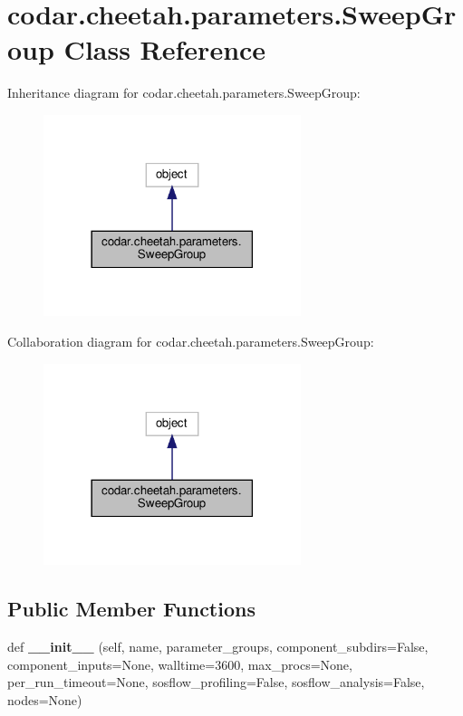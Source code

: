 \hypertarget{classcodar_1_1cheetah_1_1parameters_1_1_sweep_group}{}\section{codar.\+cheetah.\+parameters.\+Sweep\+Group Class Reference}
\label{classcodar_1_1cheetah_1_1parameters_1_1_sweep_group}


Inheritance diagram for codar.\+cheetah.\+parameters.\+Sweep\+Group\+:
\nopagebreak
\begin{figure}[H]
\begin{center}
\leavevmode
\includegraphics[width=213pt]{classcodar_1_1cheetah_1_1parameters_1_1_sweep_group__inherit__graph}
\end{center}
\end{figure}


Collaboration diagram for codar.\+cheetah.\+parameters.\+Sweep\+Group\+:
\nopagebreak
\begin{figure}[H]
\begin{center}
\leavevmode
\includegraphics[width=213pt]{classcodar_1_1cheetah_1_1parameters_1_1_sweep_group__coll__graph}
\end{center}
\end{figure}
\subsection*{Public Member Functions}
\begin{DoxyCompactItemize}
\item 
\mbox{\label{classcodar_1_1cheetah_1_1parameters_1_1_sweep_group_a811b57bffdfc485303eba98c45207c64}} 
def {\bfseries \+\_\+\+\_\+init\+\_\+\+\_\+} (self, name, parameter\+\_\+groups, component\+\_\+subdirs=False, component\+\_\+inputs=None, walltime=3600, max\+\_\+procs=None, per\+\_\+run\+\_\+timeout=None, sosflow\+\_\+profiling=False, sosflow\+\_\+analysis=False, nodes=None)
\end{DoxyCompactItemize}
